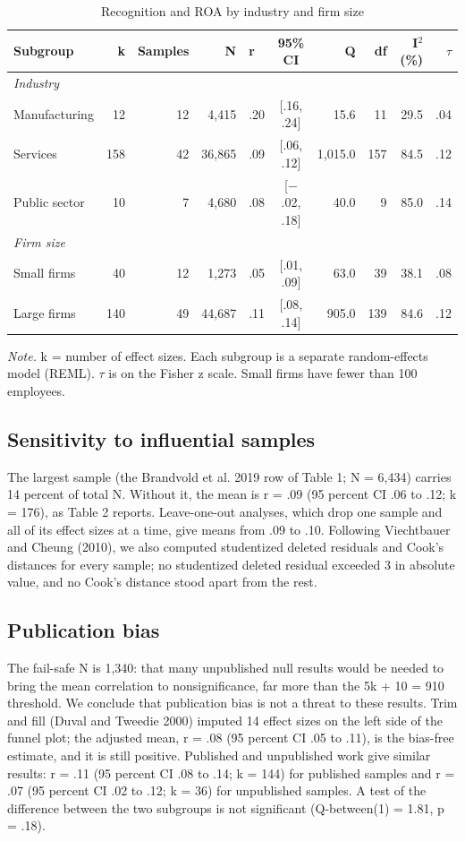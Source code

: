 \documentclass[11pt]{article}
\begin{document}
\begin{table}[H]
\centering
\small
\caption{Recognition and ROA by industry and firm size}
\begin{tabular}{lrrrlcrrrr}
\toprule
Subgroup & k & Samples & N & r & 95\% CI & Q & df & I$^2$ (\%) & $\tau$ \\
\midrule
\multicolumn{10}{l}{\textit{Industry}}\\
Manufacturing & 12 & 12 & 4,415 & .20 & [.16, .24] & 15.6 & 11 & 29.5 & .04 \\
Services & 158 & 42 & 36,865 & .09 & [.06, .12] & 1,015.0 & 157 & 84.5 & .12 \\
Public sector & 10 & 7 & 4,680 & .08 & [$-$.02, .18] & 40.0 & 9 & 85.0 & .14 \\
\multicolumn{10}{l}{\textit{Firm size}}\\
Small firms & 40 & 12 & 1,273 & .05 & [.01, .09] & 63.0 & 39 & 38.1 & .08 \\
Large firms & 140 & 49 & 44,687 & .11 & [.08, .14] & 905.0 & 139 & 84.6 & .12 \\
\bottomrule
\end{tabular}

\smallskip
\parbox{0.95\textwidth}{\footnotesize\textit{Note.} k = number of effect sizes. Each subgroup is a separate random-effects model (REML). $\tau$ is on the Fisher z scale. Small firms have fewer than 100 employees.}
\end{table}

\subsection{Sensitivity to influential samples}

The largest sample (the Brandvold et al. 2019 row of Table 1; N = 6,434) carries 14 percent of total N. Without it, the mean is r = .09 (95 percent CI .06 to .12; k = 176), as Table 2 reports. Leave-one-out analyses, which drop one sample and all of its effect sizes at a time, give means from .09 to .10. Following Viechtbauer and Cheung (2010), we also computed studentized deleted residuals and Cook's distances for every sample; no studentized deleted residual exceeded 3 in absolute value, and no Cook's distance stood apart from the rest.

\subsection{Publication bias}

The fail-safe N is 1,340: that many unpublished null results would be needed to bring the mean correlation to nonsignificance, far more than the 5k + 10 = 910 threshold. We conclude that publication bias is not a threat to these results. Trim and fill (Duval and Tweedie 2000) imputed 14 effect sizes on the left side of the funnel plot; the adjusted mean, r = .08 (95 percent CI .05 to .11), is the bias-free estimate, and it is still positive. Published and unpublished work give similar results: r = .11 (95 percent CI .08 to .14; k = 144) for published samples and r = .07 (95 percent CI .02 to .12; k = 36) for unpublished samples. A test of the difference between the two subgroups is not significant (Q-between(1) = 1.81, p = .18).
\end{document}

